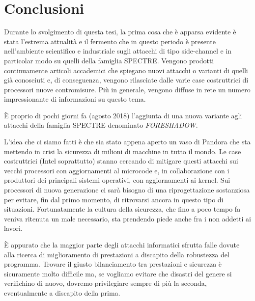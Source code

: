 \chapter{Conclusioni}
	Durante lo svolgimento di questa tesi, la prima cosa che è apparsa evidente è stata l'estrema attualità e il fermento che in questo periodo è presente nell'ambiente scientifico e industriale sugli attacchi di tipo side-channel e in particolar modo su quelli della famiglia SPECTRE. Vengono prodotti continuamente articoli accademici che spiegano nuovi attacchi o varianti di quelli già conosciuti e, di conseguenza, vengono rilasciate dalle varie case costruttrici di processori nuove contromisure. Più in generale, vengono diffuse in rete un numero impressionante di informazioni su questo tema.
	
	\`{E} proprio di pochi giorni fa (agosto 2018) l'aggiunta di una nuova variante agli attacchi della famiglia SPECTRE denominato \emph{FORESHADOW}\cite{bulck2018foreshadow}.
	
	L'idea che ci siamo fatti è che sia stato appena aperto un vaso di Pandora che sta mettendo in crisi la sicurezza di milioni di macchine in tutto il mondo. Le case costruttrici (Intel soprattutto) stanno cercando di mitigare questi attacchi sui vecchi processori con aggiornamenti al microcode e, in collaborazione con i produttori dei principali sistemi operativi, con aggiornamenti ai kernel. Sui processori di nuova generazione ci sarà bisogno di una riprogettazione sostanziosa per evitare, fin dal primo momento, di ritrovarsi ancora in questo tipo di situazioni. Fortunatamente la cultura della sicurezza, che fino a poco tempo fa veniva ritenuta un male necessario, sta prendendo piede anche fra i non addetti ai lavori. 
	
	\`{E} appurato che la maggior parte degli attacchi informatici sfrutta falle dovute alla ricerca di miglioramento di prestazioni a discapito della robustezza del programma. Trovare il giusto bilanciamento tra prestazioni e sicurezza è sicuramente molto difficile ma, se vogliamo evitare che disastri del genere si verifichino di nuovo, dovremo privilegiare sempre di più la seconda, eventualmente a discapito della prima.
	
	